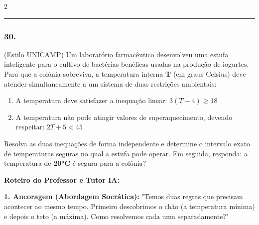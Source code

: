 \begin{multicols*}{2}
\par\vspace{\espacoQuestao}


\noindent\textcolor{CorLinha}{\rule{\linewidth}{0.5pt}} 
\par\vspace{\espacoPreQuestao}
\subsubsection*{30.} 
\begin{enunciadoLiteral}
(Estilo UNICAMP) Um laboratório farmacêutico desenvolveu uma estufa inteligente para o cultivo de bactérias benéficas usadas na produção de iogurtes. Para que a colônia sobreviva, a temperatura interna \textbf{T} (em graus Celsius) deve atender simultaneamente a um sistema de duas restrições ambientais:

\begin{enumerate}[label=\Roman*., itemsep=\espacoAlt]
\item A temperatura deve satisfazer a inequação linear: $ 3(T - 4) \ge 18 $
\item A temperatura não pode atingir valores de superaquecimento, devendo respeitar: $ 2T + 5 < 45 $
\end{enumerate}

Resolva as duas inequações de forma independente e determine o intervalo exato de temperaturas seguras no qual a estufa pode operar. Em seguida, responda: a temperatura de \textbf{20°C} é segura para a colônia?
\end{enunciadoLiteral}

\ifgabarito
    \begin{tcolorbox}[colback=CorTitUm!5, colframe=CorTitUm, boxrule=1pt, arc=4pt, left=6pt, right=6pt, top=6pt, bottom=6pt]
    \small\textbf{\textcolor{CorTitUm}{Roteiro do Professor e Tutor IA:}}\par\vspace{0.1cm}
    \color{CinzaEscuro}
    \textbf{1. Ancoragem (Abordagem Socrática):} "Temos duas regras que precisam acontecer ao mesmo tempo. Primeiro descobrimos o chão (a temperatura mínima) e depois o teto (a máxima). Como resolvemos cada uma separadamente?"\par\vspace{0.1cm}
    

\end{tcolorbox}
\end{multicols*}
